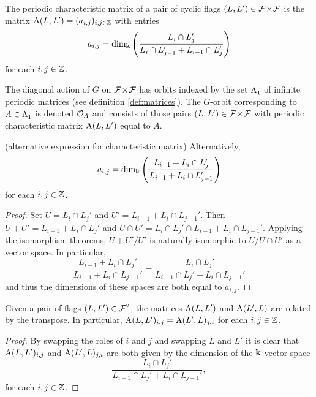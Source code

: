 \documentclass[a4paper, 11pt]{report}
\begin{document}
\begin{definition}\label{def:characteristic-matrix}
The periodic characteristic matrix of a pair of cyclic flags $(L,L')\in{\mathcal{F}\!\times\!\mathcal{F}}$ is the matrix $\operatorname{A}(L,L')=(a_{i,j})_{i,j\in\mathbb{Z}}$ with entries
\begin{equation*}
a_{i,j} = \dim_{\mathbf{k}}\left(\frac{L_i\cap L_j'}{L_i\cap L_{j-1}' + L_{i-1}\cap L_j'}\right)
\end{equation*}
for each $i,j\in\mathbb{Z}$.
\end{definition}

The diagonal action of $G$ on ${\mathcal{F}\!\times\!\mathcal{F}}$ has orbits indexed by the set $\Lambda_1^{}$ of infinite periodic matrices (see definition \ref{def:matrices}). The $G$-orbit corresponding to $A\in\Lambda_1^{}$ is denoted $\mathcal{O}_{A}$ and consists of those pairs $(L,L')\in{\mathcal{F}\!\times\!\mathcal{F}}$ with periodic characteristic matrix $\operatorname{A}(L,L')$ equal to $A$.

\begin{lemma}(alternative expression for characteristic matrix)
Alternatively,
\begin{equation*}
a_{i,j} = \dim_{\mathbf{k}}\left(\frac{L_{i-1} + L_i\cap L_j'}{L_{i-1} + L_i\cap L_{j-1}'}\right)
\end{equation*}
for each $i,j\in\mathbb{Z}$.
\end{lemma}
\begin{proof}
Set $U=L_i\cap L_j'$ and $U'=L_{i-1}+L_i\cap L_{j-1}'$. Then $U+U'=L_{i-1}+L_i\cap L_j'$ and $U\cap U'= L_i\cap L_j'\cap L_{i-1} + L_i\cap L_{j-1}'$. Applying the isomorphism theorems, ${U+U'}/{U'}$ is naturally isomorphic to $U/{U\cap U'}$ as a vector space. In particular,
\begin{equation*}
\frac{L_{i-1}+L_i\cap L_j'}{L_{i-1} + L_i\cap L_{j-1}'} = \frac{L_i\cap L_j'}{L_{i-1}\cap L_j' + L_i\cap L_{j-1}'}
\end{equation*}
and thus the dimensions of these spaces are both equal to $a_{i,j}$.
\end{proof}

\begin{lemma}
Given a pair of flags $(L,L')\in\mathcal{F}^2$, the matrices $\operatorname{A}(L,L')$ and $\operatorname{A}(L',L)$ are related by the transpose. In particular, $\operatorname{A}(L,L')_{i,j} = \operatorname{A}(L',L)_{j,i}$ for each $i,j\in\mathbb{Z}$.
\end{lemma}
\begin{proof}
By swapping the roles of $i$ and $j$ and swapping $L$ and $L'$ it is clear that $\operatorname{A}(L,L')_{i,j}$ and $\operatorname{A}(L',L)_{j,i}$ are both given by the dimension of the $\mathbf{k}$-vector space
\begin{equation*}
\frac{L_i\cap L_j'}{L_{i-1}\cap L_j' + L_i\cap L_{j-1}'},
\end{equation*}
for each $i,j\in\mathbb{Z}$.
\end{proof}
\end{document}
